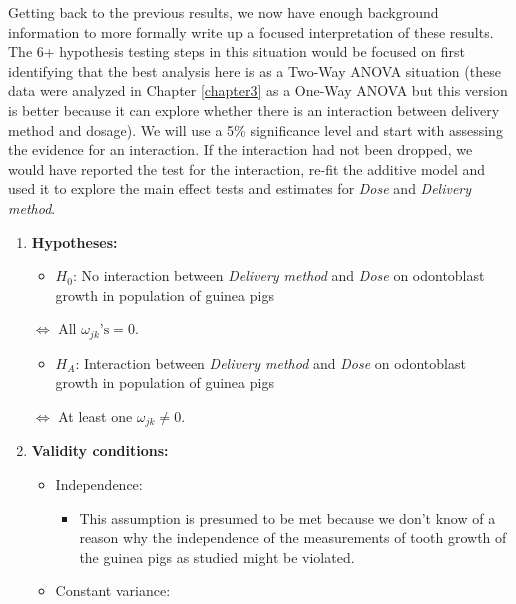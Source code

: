 \documentclass[]{book}
\providecommand{\tightlist}{%
  \setlength{\itemsep}{0pt}\setlength{\parskip}{0pt}}
\theoremstyle{definition}
\theoremstyle{definition}
\theoremstyle{remark}
\begin{document}
Getting back to the previous results, we now have enough background
information to more formally write up a focused interpretation of these
results. The 6+ hypothesis testing steps in this situation would be
focused on first identifying that the best analysis here is as a Two-Way
ANOVA situation (these data were analyzed in Chapter \ref{chapter3} as a
One-Way ANOVA but this version is better because it can explore whether
there is an interaction between delivery method and dosage). We will use
a 5\% significance level and start with assessing the evidence for an
interaction. If the interaction had not been dropped, we would have
reported the test for the interaction, re-fit the additive model and
used it to explore the main effect tests and estimates for \emph{Dose}
and \emph{Delivery method}.

\begin{enumerate}
\def\labelenumi{\arabic{enumi}.}
\item
  \textbf{Hypotheses:}

  \begin{itemize}
  \tightlist
  \item
    \(H_0\): No interaction between \emph{Delivery method} and
    \emph{Dose} on odontoblast growth in population of guinea pigs
  \end{itemize}

  \(\Leftrightarrow\) All \(\omega_{jk}\text{'s}=0\).

  \begin{itemize}
  \tightlist
  \item
    \(H_A\): Interaction between \emph{Delivery method} and \emph{Dose}
    on odontoblast growth in population of guinea pigs
  \end{itemize}

  \(\Leftrightarrow\) At least one \(\omega_{jk}\ne 0\).
\item
  \textbf{Validity conditions:}

  \begin{itemize}
  \item
    Independence:

    \begin{itemize}
    \tightlist
    \item
      This assumption is presumed to be met because we don't know of a
      reason why the independence of the measurements of tooth growth of
      the guinea pigs as studied might be violated.
    \end{itemize}
  \item
    Constant variance:


\end{itemize}
\end{enumerate}
\end{document}
